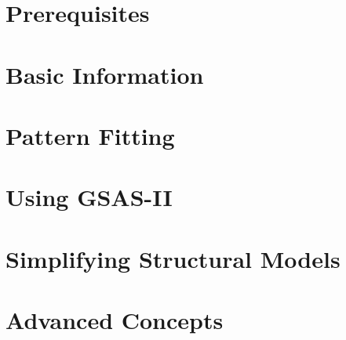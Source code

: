

\part{Prerequisites}




\part{Basic Information}






\part{Pattern Fitting}\label{sect:PatternFitting}






\part{Using GSAS-II}










\part{Simplifying Structural Models}





\part{Advanced Concepts}


 